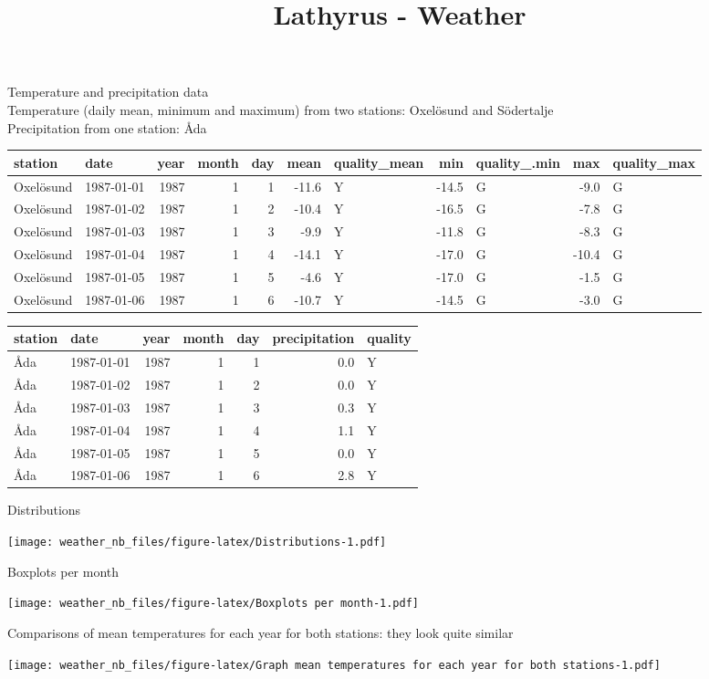 \documentclass[10pt,]{article}
\title{Lathyrus - Weather}
\author{}
\date{}
\begin{document}
\maketitle

Temperature and precipitation data\\
Temperature (daily mean, minimum and maximum) from two stations:
Oxelösund and Södertalje\\
Precipitation from one station: Åda

\begin{longtable}[]{@{}llrrrrlrlrl@{}}
\toprule
station & date & year & month & day & mean & quality\_mean & min &
quality\_.min & max & quality\_max\tabularnewline
\midrule
\endhead
Oxelösund & 1987-01-01 & 1987 & 1 & 1 & -11.6 & Y & -14.5 & G & -9.0 &
G\tabularnewline
Oxelösund & 1987-01-02 & 1987 & 1 & 2 & -10.4 & Y & -16.5 & G & -7.8 &
G\tabularnewline
Oxelösund & 1987-01-03 & 1987 & 1 & 3 & -9.9 & Y & -11.8 & G & -8.3 &
G\tabularnewline
Oxelösund & 1987-01-04 & 1987 & 1 & 4 & -14.1 & Y & -17.0 & G & -10.4 &
G\tabularnewline
Oxelösund & 1987-01-05 & 1987 & 1 & 5 & -4.6 & Y & -17.0 & G & -1.5 &
G\tabularnewline
Oxelösund & 1987-01-06 & 1987 & 1 & 6 & -10.7 & Y & -14.5 & G & -3.0 &
G\tabularnewline
\bottomrule
\end{longtable}

\begin{longtable}[]{@{}llrrrrl@{}}
\toprule
station & date & year & month & day & precipitation &
quality\tabularnewline
\midrule
\endhead
Åda & 1987-01-01 & 1987 & 1 & 1 & 0.0 & Y\tabularnewline
Åda & 1987-01-02 & 1987 & 1 & 2 & 0.0 & Y\tabularnewline
Åda & 1987-01-03 & 1987 & 1 & 3 & 0.3 & Y\tabularnewline
Åda & 1987-01-04 & 1987 & 1 & 4 & 1.1 & Y\tabularnewline
Åda & 1987-01-05 & 1987 & 1 & 5 & 0.0 & Y\tabularnewline
Åda & 1987-01-06 & 1987 & 1 & 6 & 2.8 & Y\tabularnewline
\bottomrule
\end{longtable}

Distributions

\texttt{[image: weather\_nb\_files/figure-latex/Distributions-1.pdf]}

Boxplots per month

\texttt{[image: weather\_nb\_files/figure-latex/Boxplots per month-1.pdf]}

\newpage

Comparisons of mean temperatures for each year for both stations: they
look quite similar

\texttt{[image: weather\_nb\_files/figure-latex/Graph mean temperatures for each year for both stations-1.pdf]}
\end{document}
